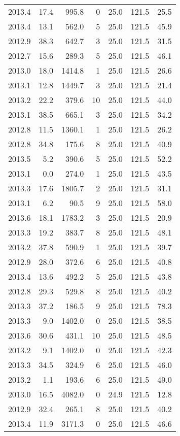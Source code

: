 \begin{tabular}{rrrrrrr}
2013.4 & 17.4 & 995.8 & 0 & 25.0 & 121.5 & 25.5 \\
2013.4 & 13.1 & 562.0 & 5 & 25.0 & 121.5 & 45.9 \\
2012.9 & 38.3 & 642.7 & 3 & 25.0 & 121.5 & 31.5 \\
2012.7 & 15.6 & 289.3 & 5 & 25.0 & 121.5 & 46.1 \\
2013.0 & 18.0 & 1414.8 & 1 & 25.0 & 121.5 & 26.6 \\
2013.1 & 12.8 & 1449.7 & 3 & 25.0 & 121.5 & 21.4 \\
2013.2 & 22.2 & 379.6 & 10 & 25.0 & 121.5 & 44.0 \\
2013.1 & 38.5 & 665.1 & 3 & 25.0 & 121.5 & 34.2 \\
2012.8 & 11.5 & 1360.1 & 1 & 25.0 & 121.5 & 26.2 \\
2012.8 & 34.8 & 175.6 & 8 & 25.0 & 121.5 & 40.9 \\
2013.5 & 5.2 & 390.6 & 5 & 25.0 & 121.5 & 52.2 \\
2013.1 & 0.0 & 274.0 & 1 & 25.0 & 121.5 & 43.5 \\
2013.3 & 17.6 & 1805.7 & 2 & 25.0 & 121.5 & 31.1 \\
2013.1 & 6.2 & 90.5 & 9 & 25.0 & 121.5 & 58.0 \\
2013.6 & 18.1 & 1783.2 & 3 & 25.0 & 121.5 & 20.9 \\
2013.3 & 19.2 & 383.7 & 8 & 25.0 & 121.5 & 48.1 \\
2013.2 & 37.8 & 590.9 & 1 & 25.0 & 121.5 & 39.7 \\
2012.9 & 28.0 & 372.6 & 6 & 25.0 & 121.5 & 40.8 \\
2013.4 & 13.6 & 492.2 & 5 & 25.0 & 121.5 & 43.8 \\
2012.8 & 29.3 & 529.8 & 8 & 25.0 & 121.5 & 40.2 \\
2013.3 & 37.2 & 186.5 & 9 & 25.0 & 121.5 & 78.3 \\
2013.3 & 9.0 & 1402.0 & 0 & 25.0 & 121.5 & 38.5 \\
2013.6 & 30.6 & 431.1 & 10 & 25.0 & 121.5 & 48.5 \\
2013.2 & 9.1 & 1402.0 & 0 & 25.0 & 121.5 & 42.3 \\
2013.3 & 34.5 & 324.9 & 6 & 25.0 & 121.5 & 46.0 \\
2013.2 & 1.1 & 193.6 & 6 & 25.0 & 121.5 & 49.0 \\
2013.0 & 16.5 & 4082.0 & 0 & 24.9 & 121.5 & 12.8 \\
2012.9 & 32.4 & 265.1 & 8 & 25.0 & 121.5 & 40.2 \\
2013.4 & 11.9 & 3171.3 & 0 & 25.0 & 121.5 & 46.6 \\

\end{tabular}
